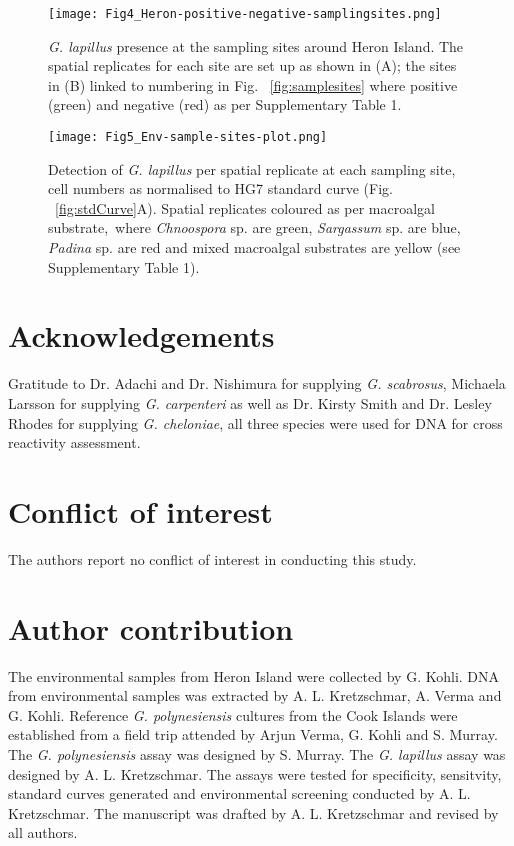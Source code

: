 \documentclass[12pt]{article}
\begin{document}
\FloatBarrier
\FloatBarrier 
\begin{figure} 
\texttt{[image: Fig4\_Heron-positive-negative-samplingsites.png]} 
\caption{\emph{G. lapillus} presence at the sampling sites around Heron Island. The spatial replicates for each site are set up as shown in (A); the sites in (B) linked to numbering in Fig. ~\ref{fig:samplesites} where positive (green) and negative (red) as per Supplementary Table 1.} 
\label{fig:envposneg}
\end{figure} 
\FloatBarrier

\begin{figure} 
\texttt{[image: Fig5\_Env-sample-sites-plot.png]} 
\caption{Detection of \emph{G. lapillus} per spatial replicate at each sampling site, cell numbers as normalised to HG7 standard curve (Fig. ~\ref{fig:stdCurve}A). Spatial replicates coloured as per macroalgal substrate,\ where \emph{Chnoospora} sp. are green, \emph{Sargassum} sp. are blue, \emph{Padina} sp. are red and mixed macroalgal substrates are yellow (see Supplementary Table 1).} 
\label{fig:envHG7}
\end{figure} 
\FloatBarrier
 \section*{Acknowledgements}
Gratitude to Dr. Adachi and Dr. Nishimura for supplying \emph{G. scabrosus}, Michaela Larsson for supplying \emph{G. carpenteri} as well as Dr. Kirsty Smith and Dr. Lesley Rhodes for supplying \emph{G. cheloniae}, all three species were used for DNA for cross reactivity assessment. 

\section*{Conflict of interest}
The authors report no conflict of interest in conducting this study.

\section*{Author contribution}
The environmental samples from Heron Island were collected by G. Kohli. DNA from environmental samples was extracted by A. L. Kretzschmar, A. Verma and G. Kohli. Reference \emph{G. polynesiensis} cultures from the Cook Islands were established from a field trip attended by Arjun Verma, G. Kohli and S. Murray. The \emph{G. polynesiensis} assay was designed by S. Murray. The \emph{G. lapillus} assay was designed by A. L. Kretzschmar. The assays were tested for specificity, sensitvity, standard curves generated and environmental screening conducted by A. L. Kretzschmar. The manuscript was drafted by A. L. Kretzschmar and revised by all authors.

\FloatBarrier
\newpage

%
%

\end{document}
